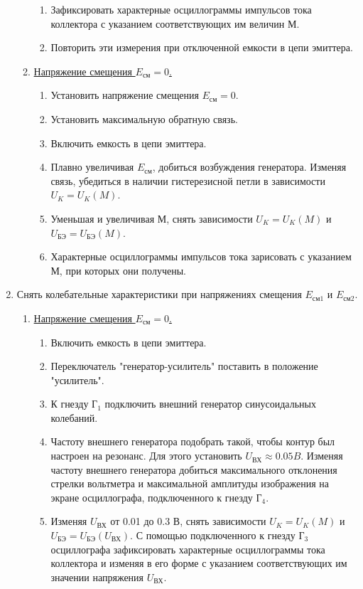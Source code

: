 \begin{enumerate}
\begin{enumerate}
\begin{enumerate}
			\item Зафиксировать характерные осциллограммы импульсов тока коллектора с указанием соответствующих им величин М.
			\item Повторить эти измерения при отключенной емкости в цепи эмиттера. 
		\end{enumerate}
		\item \underline{Напряжение смещения $E_\text{см} = 0$.}
		\begin{enumerate}
			\item Установить напряжение смещения $E_\text{см} = 0$.
			\item Установить максимальную обратную связь.
			\item Включить емкость в цепи эмиттера.
			\item Плавно увеличивая $E_\text{см}$, добиться возбуждения генератора. Изменяя связь, убедиться в наличии гистерезисной петли в зависимости $U_K=U_K(M)$.
			\item Уменьшая и увеличивая М, снять зависимости $U_K=U_K(M)$ и $U_\text{БЭ}=U_\text{БЭ}(M)$.
			\item Характерные осциллограммы импульсов тока зарисовать с указанием М, при которых они получены. 
		\end{enumerate}	
	\end{enumerate}	
	\item Снять колебательные характеристики при напряжениях смещения $E_\text{см1}$ и $E_\text{см2}$.
	\begin{enumerate}
		\item \underline{Напряжение смещения $E_\text{см} = 0$.}
		\begin{enumerate}
			\item Включить емкость в цепи эмиттера.
			\item Переключатель "генератор-усилитель" поставить в положение "усилитель".
			\item К гнезду $\text{Г}_1$ подключить внешний генератор синусоидальных колебаний.
			\item Частоту внешнего генератора подобрать такой, чтобы контур был настроен на резонанс. Для этого установить $U_\text{ВХ}\approx 0.05 B$. Изменяя частоту внешнего генератора добиться максимального отклонения стрелки вольтметра и максимальной амплитуды изображения на экране осциллографа, подключенного к гнезду $\text{Г}_4$.
			\item Изменяя $U_\text{ВХ}$ от 0.01 до 0.3 В, снять зависимости $U_K=U_K(M)$ и $U_\text{БЭ}=U_\text{БЭ}(U_\text{ВХ})$. С помощью подключенного к гнезду $\text{Г}_3$ осциллографа зафиксировать характерные осциллограммы тока коллектора и изменяя в его форме с указанием соответствующих им значении напряжения $U_\text{ВХ}$.

\end{enumerate}
\end{enumerate}
\end{enumerate}
